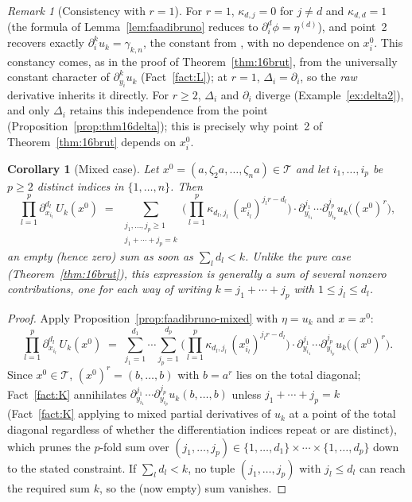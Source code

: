 \documentclass[11pt]{article}
\newtheorem{corollary}[theorem]{Corollary}
\theoremstyle{remark}
\newtheorem{remark}[theorem]{Remark}
\begin{document}
\begin{remark}[Consistency with $r=1$]
For $r=1$, $\kappa_{d,j}=0$ for $j\ne d$ and $\kappa_{d,d}=1$ (the formula of Lemma~\ref{lem:faadibruno} reduces to $\partial_i^d\phi=\eta^{(d)}$), and point~2 recovers exactly $\partial_i^ku_k=\gamma_{k,n}$, the constant from \cite[Theorem~21]{Ze}, with no dependence on $x_i^0$. This constancy comes, as in the proof of Theorem~\ref{thm:16brut}, from the universally constant character of $\partial_{y_i}^ku_k$ (Fact~\ref{fact:L}); at $r=1$, $\Delta_i=\partial_i$, so the \emph{raw} derivative inherits it directly. For $r\ge2$, $\Delta_i$ and $\partial_i$ diverge (Example~\ref{ex:delta2}), and only $\Delta_i$ retains this independence from the point (Proposition~\ref{prop:thm16delta}); this is precisely why point~2 of Theorem~\ref{thm:16brut} depends on $x_i^0$.
\end{remark}

\begin{corollary}[Mixed case]\label{cor:mixed-U_k}
Let $x^0=(a,\zeta_2a,\dots,\zeta_na)\in\mathcal T$ and let $i_1,\dots,i_p$ be $p\ge2$ distinct indices in $\{1,\dots,n\}$. Then
\[
\prod_{l=1}^p \partial_{x_{i_l}}^{d_l}\, U_k(x^0) \;=\; \sum_{\substack{j_1,\dots,j_p\ge1 \\ j_1+\cdots+j_p=k}} \Big(\prod_{l=1}^p \kappa_{d_l,j_l}\,(x_{i_l}^0)^{j_lr-d_l}\Big)\cdot \partial_{y_{i_1}}^{j_1}\cdots\partial_{y_{i_p}}^{j_p}u_k\big((x^0)^r\big),
\]
an empty (hence zero) sum as soon as $\sum_l d_l<k$. Unlike the pure case (Theorem~\ref{thm:16brut}), this expression is generally a sum of several nonzero contributions, one for each way of writing $k=j_1+\cdots+j_p$ with $1\le j_l\le d_l$.
\end{corollary}

\begin{proof}
Apply Proposition~\ref{prop:faadibruno-mixed} with $\eta=u_k$ and $x=x^0$:
\[
\prod_{l=1}^p \partial_{x_{i_l}}^{d_l}\, U_k(x^0) \;=\; \sum_{j_1=1}^{d_1}\cdots\sum_{j_p=1}^{d_p} \Big(\prod_{l=1}^p \kappa_{d_l,j_l}\,(x_{i_l}^0)^{j_lr-d_l}\Big)\cdot \partial_{y_{i_1}}^{j_1}\cdots\partial_{y_{i_p}}^{j_p}u_k\big((x^0)^r\big).
\]
Since $x^0\in\mathcal T$, $(x^0)^r=(b,\dots,b)$ with $b=a^r$ lies on the total diagonal; Fact~\ref{fact:K} annihilates $\partial_{y_{i_1}}^{j_1}\cdots\partial_{y_{i_p}}^{j_p}u_k(b,\dots,b)$ unless $j_1+\cdots+j_p=k$ (Fact~\ref{fact:K} applying to mixed partial derivatives of $u_k$ at a point of the total diagonal regardless of whether the differentiation indices repeat or are distinct), which prunes the $p$-fold sum over $(j_1,\dots,j_p)\in\{1,\dots,d_1\}\times\cdots\times\{1,\dots,d_p\}$ down to the stated constraint. If $\sum_l d_l<k$, no tuple $(j_1,\dots,j_p)$ with $j_l\le d_l$ can reach the required sum $k$, so the (now empty) sum vanishes.
\end{proof}
\end{document}
